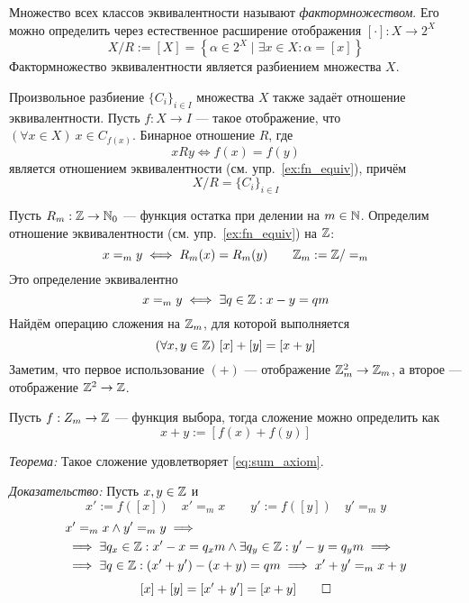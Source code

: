 Множество всех классов эквивалентности называют
{\it фактормножеством}.
Его можно определить через естественное
расширение отображения $[\cdot]:X\to 2^{X}$
\[
  X/R:=[X]=\left\{\alpha\in 2^{X}\;\big|\; \exists x\in X:\alpha=[x]\right\}
\]
Фактормножество эквивалентности является разбиением множества $X$.

Произвольное разбиение $\{C_{i}\}_{i\in I}$ множества $X$ также задаёт
отношение эквивалентности. Пусть $f:X\to I$ --- такое отображение,
что $(\forall x\in X)~x\in C_{f(x)}$. Бинарное отношение $R$, где
\[
  xRy\iff f(x)=f(y)
\]
является отношением эквивалентности (см. упр.~\ref{ex:fn_equiv}),
причём
\[
  X/R=\{C_{i}\}_{i\in I}
\]

Пусть $R_{m}:\mathbb Z\to\mathbb N_0$ --- функция остатка при делении на $m\in\mathbb N$.
% 
Определим отношение эквивалентности (см. упр.~\ref{ex:fn_equiv}) на $\mathbb Z$:
\[
  x=_{m}y\iff R_{m}(x)=R_{m}(y)\qquad \mathbb Z_{m}:=\mathbb Z/=_{m}
\]
Это определение эквивалентно
\[
  x=_{m}y\iff \exists q\in\mathbb Z:x-y=qm
\]
Найдём операцию сложения на $\mathbb Z_{m}$, для которой выполняется
\begin{equation}\label{eq:sum_axiom}
  (\forall x,y\in\mathbb Z)~[x]+[y]=[x+y]
\end{equation}
Заметим, что первое использование $(+)$ --- отображение $\mathbb Z_{m}^{2}\to \mathbb Z_{m}$,
а второе --- отображение $\mathbb Z^{2}\to\mathbb Z$.

Пусть $f:Z_{m}\to \mathbb Z$ --- функция выбора, тогда сложение можно
определить как
\[
  x+y:=[f(x)+f(y)]
\]

\vspace{1em}
{\it Теорема:}
Такое сложение удовлетворяет \eqref{eq:sum_axiom}.

{\it Доказательство:}
Пусть $x,y\in \mathbb Z$ и
\[
  x':=f([x])\quad x'=_{m}x\qquad y':=f([y])\quad y'=_{m}y
\]
\[
  \begin{aligned}
     & x'=_{m}x\land y'=_{m}y\implies                                 \\
     & \implies \exists q_{x}\in\mathbb Z:x'-x=q_{x}m\land
    \exists q_{y}\in\mathbb Z:y'-y=q_{y}m\implies                            \\
     & \implies \exists q\in\mathbb Z:(x'+y')-(x+y)=qm\implies x'+y'=_{m}x+y
  \end{aligned}
\]
\[
  [x]+[y]=[x'+y']=[x+y]\qed
\]

